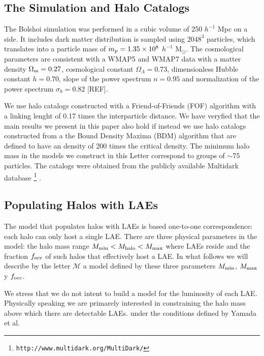 \documentclass{emulateapj}
\begin{document}
\subsection{The Simulation and Halo Catalogs}

The Bolshoi simulation was performed in a cubic volume of 250 $h^{-1}$ Mpc on a side. It includes dark matter distribution is sampled using $2048^{3}$ particles, which translates into a particle mass of $m_{\rm p}=1.35\times 10^{8}$ $h^{-1}$ M$_{\odot}$.  The cosmological parameters are consistent with a WMAP5 and WMAP7 data with a matter density $\Omega_{\rm m} = 0.27$, cosmological constant $\Omega_{\Lambda}=0.73$, dimensionless Hubble constant $h=0.70$, slope of the power spectrum $n=0.95$ and normalization of the power spectrum $\sigma_{8}=0.82$ [REF].

We use halo catalogs constructed with a Friend-of-Friends (FOF) algorithm with a linking lenght of 0.17 times the interparticle distance. We have veryfied that the main results we present in this paper also hold if instead we use halo catalogs constructed from a the Bound Density Maxima (BDM) algorithm \citep{KlypinBDM} that are defined to have an density of 200 times the critical density. The minimum halo mass in the models we construct in this Letter correspond to groups of $\sim 75$ particles. The catalogs were obtained from the publicly available Multidark database \footnote{{\tt http://www.multidark.org/MultiDark/}} \citep{2011arXiv1109.0003R}. 



\subsection{Populating Halos with LAEs}
\label{subsec:mocks}

The model that populates halos with LAEs is based one-to-one correspondence: each halo can only host a single LAE. There are three physical parameters in the model: the halo mass range $M_{\rm min}< M_{\rm halo} < M_{\rm max}$ where LAEs reside and the fraction $f_{\rm occ}$ of such halos that effectively host a LAE. In what follows we will describe by the letter ${\mathcal M}$ a model defined by these three parameters $M_{\rm min}$, $M_{\rm max}$ y $f_{\rm occ}$.

We stress that we do not intent to build a model for the luminosity of each LAE. Physically speaking we are primarely interested in constraining the halo mass above which there are detectable LAEs. under the conditions defined by Yamada et al. 
\end{document}

